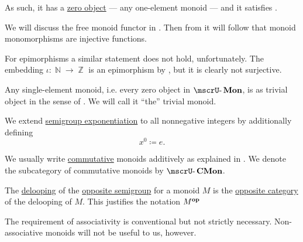 \begin{definition}
\begin{thmenum}
    As such, it has a \hyperref[def:universal_objects/zero]{zero object} --- any one-element monoid --- and it satisfies .

    We will discuss the free monoid functor in . Then from  it will follow that monoid monomorphisms are injective functions.

    For epimorphisms a similar statement does not hold, unfortunately. The embedding \( \iota: \BbbN \to \BbbZ \) is an epimorphism by , but it is clearly not surjective.

    \mimprovised Any single-element monoid, i.e. every zero object in \( \ucat{Mon} \), is as trivial object in the sense of . We will call it \enquote{the} trivial monoid.

     We extend \hyperref[def:semigroup/exponentiation]{semigroup exponentiation} to all nonnegative integers by additionally defining
    \begin{equation*}
      x^0 \coloneqq e.
    \end{equation*}

     We usually write \hyperref[def:binary_operation/commutative]{commutative} monoids additively as explained in . We denote the subcategory of commutative monoids by \( \ucat{CMon} \).

    \mimprovised The \hyperref[def:monoid_delooping]{delooping} of the \hyperref[def:semigroup/opposite]{opposite semigroup} for a monoid \( M \) is the \hyperref[def:opposite_category]{opposite category} of the delooping of \( M \). This justifies the notation \( M^\oppos \)
  \end{thmenum}
\end{definition}
\begin{comments}
  \item The requirement of associativity is conventional but not strictly necessary. Non-associative monoids will not be useful to us, however.
\end{comments}


